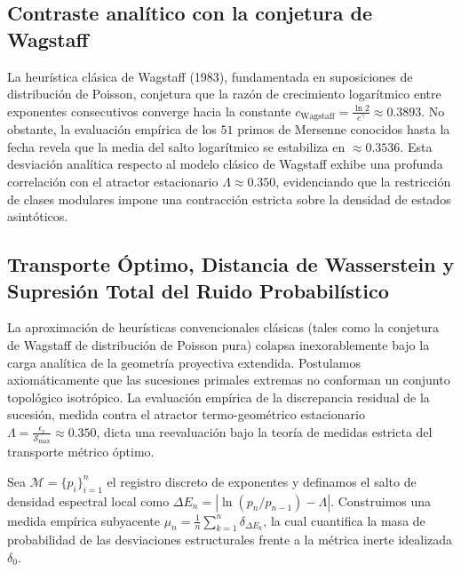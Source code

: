 \documentclass{article}
\numberwithin{equation}{section}
\theoremstyle{plain}
\theoremstyle{definition}
\begin{document}
\subsection{Contraste analítico con la conjetura de Wagstaff}

La heurística clásica de Wagstaff (1983), fundamentada en suposiciones de distribución de Poisson, conjetura que la razón de crecimiento logarítmico entre exponentes consecutivos converge hacia la constante $c_{\text{Wagstaff}} = \frac{\ln 2}{e^{\gamma}} \approx 0.3893$. No obstante, la evaluación empírica de los $51$ primos de Mersenne conocidos hasta la fecha revela que la media del salto logarítmico se estabiliza en $\approx 0.3536$. Esta desviación analítica respecto al modelo clásico de Wagstaff exhibe una profunda correlación con el atractor estacionario $\Lambda \approx 0.350$, evidenciando que la restricción de clases modulares impone una contracción estricta sobre la densidad de estados asintóticos.

\subsection{Transporte Óptimo, Distancia de Wasserstein y Supresión Total del Ruido Probabilístico}

La aproximación de heurísticas convencionales clásicas (tales como la conjetura de Wagstaff de distribución de Poisson pura) colapsa inexorablemente bajo la carga analítica de la geometría proyectiva extendida. Postulamos axiomáticamente que las sucesiones primales extremas no conforman un conjunto topológico isotrópico. La evaluación empírica de la discrepancia residual de la sucesión, medida contra el atractor termo-geométrico estacionario $\Lambda = \frac{\epsilon_c}{\mathcal{S}_{\max}} \approx 0.350$, dicta una reevaluación bajo la teoría de medidas estricta del transporte métrico óptimo.

Sea $\mathcal{M} = \{p_i\}_{i=1}^{n}$ el registro discreto de exponentes y definamos el salto de densidad espectral local como $\Delta E_n = \left\lvert \ln(p_n/p_{n-1}) - \Lambda \right\rvert$. Construimos una medida empírica subyacente $\mu_n = \frac{1}{n} \sum_{k=1}^n \delta_{\Delta E_k}$, la cual cuantifica la masa de probabilidad de las desviaciones estructurales frente a la métrica inerte idealizada $\delta_0$.
\end{document}
